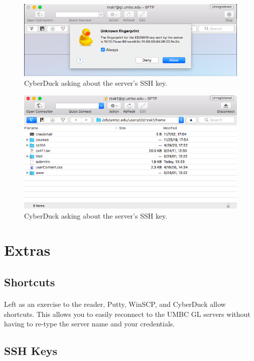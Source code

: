 \documentclass[letter,11pt]{article}
\begin{document}
\begin{figure}
\centering
\includegraphics[scale=0.6]{Images/macos_cyberduck_firsttime.png}
\caption{CyberDuck asking about the server's SSH key.}
\label{fig:maccyberduckconnectfirsttime}
\end{figure}

\begin{figure}
\centering
\includegraphics[scale=0.6]{Images/macos_cyberduck_connected.png}
\caption{CyberDuck asking about the server's SSH key.}
\label{fig:maccyberduckconnected}
\end{figure}

\FloatBarrier
\section{Extras}
\subsection{Shortcuts}
\paragraph{}Left as an exercise to the reader, Putty, WinSCP, and CyberDuck allow shortcuts. This allows you to easily reconnect to the UMBC GL servers without having to re-type the server name and your credentials.

\subsection{SSH Keys}
\end{document}
